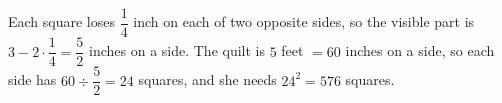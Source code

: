 Each square loses $\dfrac{1}{4}$ inch on each of two opposite sides, so the visible part is $3-2\cdot\dfrac{1}{4}=\dfrac{5}{2}$ inches on a side. The quilt is $5$ feet $=60$ inches on a side, so each side has $60\div\dfrac{5}{2}=24$ squares, and she needs $24^2=\boxed{576}$ squares.
